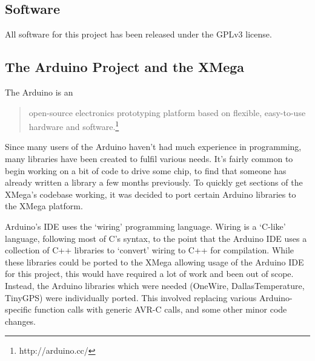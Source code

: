 \documentclass[a4paper,12pt]{article}
\begin{document}
\begin{appendices}
\section{Software}
All software for this project has been released under the GPLv3 license. 

\subsection{The Arduino Project and the XMega}
The Arduino is an
\begin{quote}
open-source electronics prototyping platform based on flexible, easy-to-use hardware and software.\footnote{http://arduino.cc/}
\end{quote}
Since many users of the Arduino haven't had much experience in programming, many libraries have been created to fulfil various needs. It's fairly common to begin working on a bit of code to drive some chip, to find that someone has already written a library a few months previously. To quickly get sections of the XMega's codebase working, it was decided to port certain Arduino libraries to the XMega platform. 

Arduino's IDE uses the `wiring' programming language. Wiring is a `C-like' language, following most of C's syntax, to the point that the Arduino IDE uses a collection of C++ libraries to `convert' wiring to C++ for compilation. While these libraries could be ported to the XMega allowing usage of the Arduino IDE for this project, this would have required a lot of work and been out of scope. Instead, the Arduino libraries which were needed (OneWire, DallasTemperature, TinyGPS) were individually ported. This involved replacing various Arduino-specific function calls with generic AVR-C calls, and some other minor code changes. 

\end{appendices}
\end{document}
